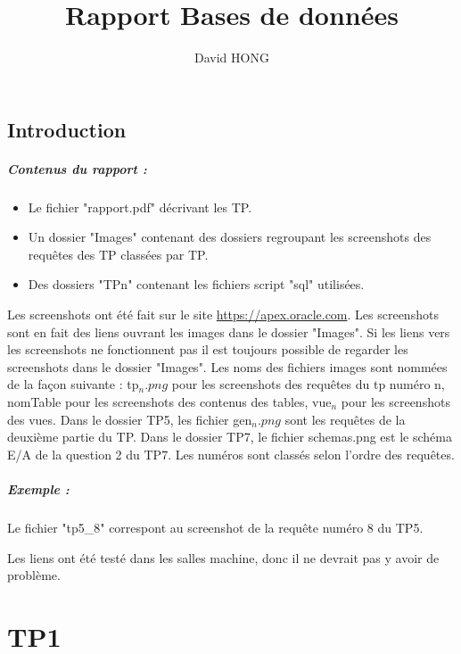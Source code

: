 \documentclass{report}
\title{Rapport Bases de données}
\author{David HONG}
\begin{document}
\maketitle

\tableofcontents


\newpage
\section*{Introduction}

\paragraph{Contenus du rapport : }
\begin{itemize}
	\item Le fichier "rapport.pdf" décrivant les TP.
	\item Un dossier "Images" contenant des dossiers regroupant les screenshots des requêtes des TP classées par TP.
	\item Des dossiers "TPn" contenant les fichiers script "sql" utilisées.
\end{itemize}

Les screenshots ont été fait sur le site \url{https://apex.oracle.com}. Les screenshots sont en fait des liens ouvrant les images dans le dossier "Images".
Si les liens vers les screenshots ne fonctionnent pas il est toujours possible de regarder les screenshots dans le dossier "Images".
Les noms des fichiers images sont nommées de la façon suivante : tp$_{n}.png$ pour les screenshots des requêtes du tp numéro n, nomTable pour les screenshots des contenus des tables, vue$_{n}$ pour les screenshots des vues.
Dans le dossier TP5, les fichier gen$_{n}.png$ sont les requêtes de la deuxième partie du TP.
Dans le dossier TP7, le fichier schemas.png est le schéma E/A de la question 2 du TP7.
Les numéros sont classés selon l'ordre des requêtes.
\paragraph{Exemple :} Le fichier "tp5\_8" correspont au screenshot de la requête numéro 8 du TP5.

Les liens ont été testé dans les salles machine, donc il ne devrait pas y avoir de problème.

\chapter{TP1}
\end{document}
